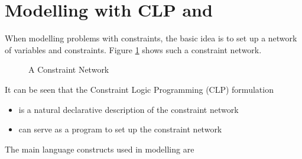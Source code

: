 \section{Modelling with CLP and \eclipse{}}

When modelling problems with constraints, the basic idea is to set up
a network of variables and constraints. Figure \ref{figconsnet} shows
such a constraint network.
\begin{figure}
\begin{center}
\end{center}
\caption{A Constraint Network}
\label{figconsnet}
\end{figure}
It can be seen that the Constraint Logic Programming (CLP) formulation
\begin{itemize}
\item is a natural declarative description of the constraint network
\item can serve as a program to set up the constraint network
\end{itemize}
The main \eclipse{} language constructs used in modelling are
